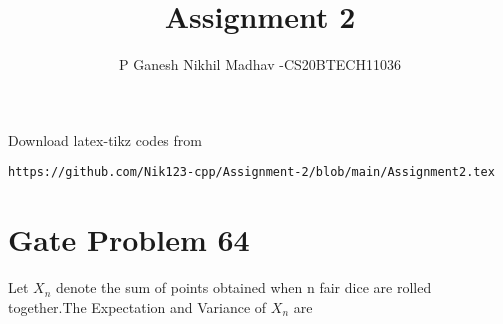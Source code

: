 \documentclass[journal,12pt,twocolumn]{IEEEtran}
\begin{document}
     \def\rightbox#1{\makebox[0in][r]{#1}}
     \def\centbox#1{\makebox[0in]{#1}}
     \def\topbox#1{\raisebox{-\baselineskip}[0in][0in]{#1}}
     \def\midbox#1{\raisebox{-0.5\baselineskip}[0in][0in]{#1}}
\vspace{3cm}
\title{Assignment 2}
\author{P Ganesh Nikhil Madhav -CS20BTECH11036}
\maketitle
\newpage
\bigskip
\renewcommand{\thefigure}{\theenumi}
\renewcommand{\thetable}{\theenumi}
Download  latex-tikz codes from 
\begin{lstlisting}
https://github.com/Nik123-cpp/Assignment-2/blob/main/Assignment2.tex
\end{lstlisting}
\section{Gate Problem 64}
Let $X_{n}$ denote the sum of points obtained when n fair dice are rolled together.The Expectation and Variance of $X_{n}$ are
\end{document}

